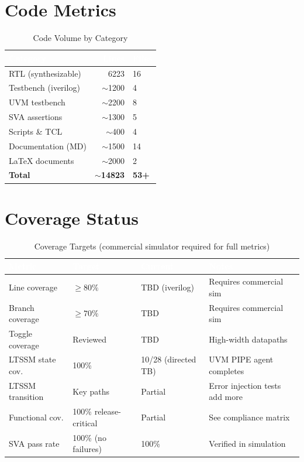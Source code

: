 \documentclass[12pt,a4paper]{report}
\newcommand{\theadcell}[1]{%
  \cellcolor{tablehead}\textcolor{white}{\textbf{#1}}}
\begin{document}
\section{Code Metrics}

\begin{table}[H]
\centering
\caption{Code Volume by Category}
\label{tab:codemetrics}
\begin{tabular}{lrl}
  \toprule
  \theadcell{Category} & \theadcell{Lines} & \theadcell{Files} \\
  \midrule
  RTL (synthesizable)  & 6223  & 16 \\
  Testbench (iverilog) & $\sim$1200 & 4 \\
  UVM testbench        & $\sim$2200 & 8 \\
  SVA assertions       & $\sim$1300 & 5 \\
  Scripts \& TCL       & $\sim$400  & 4 \\
  Documentation (MD)   & $\sim$1500 & 14 \\
  LaTeX documents      & $\sim$2000 & 2 \\
  \midrule
  \textbf{Total}       & \textbf{$\sim$14823} & \textbf{53+} \\
  \bottomrule
\end{tabular}
\end{table}

\section{Coverage Status}

\begin{table}[H]
\centering
\caption{Coverage Targets (commercial simulator required for full metrics)}
\label{tab:coverage}
\begin{tabular}{llll}
  \toprule
  \theadcell{Metric} & \theadcell{Target} & \theadcell{Current} & \theadcell{Notes} \\
  \midrule
  Line coverage       & $\geq 80\%$   & TBD (iverilog) & Requires commercial sim \\
  Branch coverage     & $\geq 70\%$   & TBD            & Requires commercial sim \\
  Toggle coverage     & Reviewed      & TBD            & High-width datapaths \\
  LTSSM state cov.   & 100\%         & 10/28 (directed TB) & UVM PIPE agent completes \\
  LTSSM transition   & Key paths      & Partial         & Error injection tests add more \\
  Functional cov.    & 100\% release-critical & Partial & See compliance matrix \\
  SVA pass rate      & 100\% (no failures) & 100\%   & Verified in simulation \\
  \bottomrule
\end{tabular}
\end{table}
\end{document}
